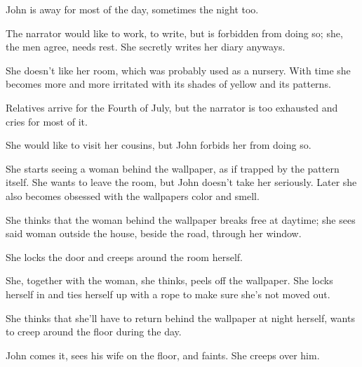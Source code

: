 \documentclass{article}
\begin{document}
John is away for most of the day, sometimes the night too. 
 
The narrator would like to work, to write, but is forbidden from doing so; she, the men agree, needs rest. She secretly writes her diary anyways.
 
She doesn't like her room, which was probably used as a nursery. With time she becomes more and more irritated with its shades of yellow and its patterns.
 
Relatives arrive for the Fourth of July, but the narrator is too exhausted and cries for most of it.
 
She would like to visit her cousins, but John forbids her from doing so.
 
She starts seeing a woman behind the wallpaper, as if trapped by the pattern itself. She wants to leave the room, but John doesn't take her seriously. Later she also becomes obsessed with the wallpapers color and smell.
 
She thinks that the woman behind the wallpaper breaks free at daytime; she sees said woman outside the house, beside the road, through her window.
 
She locks the door and creeps around the room herself.
 
She, together with the woman, she thinks, peels off the wallpaper. She locks herself in and ties herself up with a rope to make sure she's not moved out.
 
She thinks that she'll have to return behind the wallpaper at night herself, wants to creep around the floor during the day.
 
John comes it, sees his wife on the floor, and faints. She creeps over him. 
 
\end{document}
